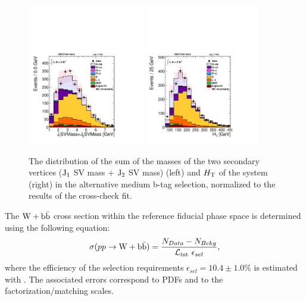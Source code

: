 \begin{figure}
\centering
\includegraphics[width=0.45\textwidth]{Wbb/fig3a.pdf}
\includegraphics[width=0.45\textwidth]{Wbb/fig4a.pdf}
\caption{
The distribution of the sum of the masses of the two secondary vertices ($\rm{J_1}$ SV mass + $\rm{J_2}$ SV mass) (left)  and $H_{\rm{T}}$ of the system (right) in the alternative
medium b-tag selection, 
normalized to the results of the cross-check fit. 
}
\label{figC}
\end{figure}

The $\mathrm{W+\mathrm{b\bar{b}}}$ cross section within the reference fiducial phase space
is determined using the following equation:
\begin{equation*} 
\sigma(pp\rightarrow \mathrm{W+\mathrm{b\bar{b}}}) = \frac{N_{Data}-N_{Bckg}}{{\cal L}_{\mathrm{int}}~\epsilon_{sel}},
\nonumber
\end{equation*}
where the efficiency of the selection requirements $\epsilon_{sel} = 10.4 \pm 1.0\%$
is estimated with \MADGRAPH. The associated errors correspond to PDFs and to the factorization/matching scales.

